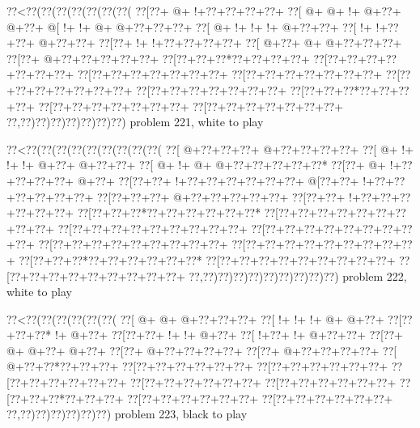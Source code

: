 \vbox{\vbox{\goo
\0??<\0??(\0??(\0??(\0??(\0??(\0??(\0??(
\0??[\0??+\- @+\- !+\0??+\0??+\0??+\0??+
\0??[\- @+\- @+\- !+\- @+\0??+\- @+\0??+
\- @[\- !+\- !+\- @+\- @+\0??+\0??+\0??+
\0??[\- @+\- !+\- !+\- !+\- @+\0??+\0??+
\0??[\- !+\- !+\0??+\0??+\- @+\0??+\0??+
\0??[\0??+\- !+\- !+\0??+\0??+\0??+\0??+
\0??[\- @+\0??+\- @+\- @+\0??+\0??+\0??+
\0??[\0??+\- @+\0??+\0??+\0??+\0??+\0??+
\0??[\0??+\0??+\0??*\0??+\0??+\0??+\0??+
\0??[\0??+\0??+\0??+\0??+\0??+\0??+\0??+
\0??[\0??+\0??+\0??+\0??+\0??+\0??+\0??+
\0??[\0??+\0??+\0??+\0??+\0??+\0??+\0??+
\0??[\0??+\0??+\0??+\0??+\0??+\0??+\0??+
\0??[\0??+\0??+\0??+\0??+\0??+\0??+\0??+
\0??[\0??+\0??+\0??*\0??+\0??+\0??+\0??+
\0??[\0??+\0??+\0??+\0??+\0??+\0??+\0??+
\0??[\0??+\0??+\0??+\0??+\0??+\0??+\0??+
\0??,\0??)\0??)\0??)\0??)\0??)\0??)\0??)
}
\hfil problem 221, white to play\hfil\break
}

\vbox{\vbox{\goo
\0??<\0??(\0??(\0??(\0??(\0??(\0??(\0??(\0??(\0??(
\0??[\- @+\0??+\0??+\0??+\- @+\0??+\0??+\0??+\0??+
\0??[\- @+\- !+\- !+\- !+\- @+\0??+\- @+\0??+\0??+
\0??[\- @+\- !+\- @+\- @+\0??+\0??+\0??+\0??+\0??*
\0??[\0??+\- @+\- !+\0??+\0??+\0??+\0??+\- @+\0??+
\0??[\0??+\0??+\- !+\0??+\0??+\0??+\0??+\0??+\0??+
\- @[\0??+\0??+\- !+\0??+\0??+\0??+\0??+\0??+\0??+
\0??[\0??+\0??+\0??+\- @+\0??+\0??+\0??+\0??+\0??+
\0??[\0??+\0??+\- !+\0??+\0??+\0??+\0??+\0??+\0??+
\0??[\0??+\0??+\0??*\0??+\0??+\0??+\0??+\0??+\0??*
\0??[\0??+\0??+\0??+\0??+\0??+\0??+\0??+\0??+\0??+
\0??[\0??+\0??+\0??+\0??+\0??+\0??+\0??+\0??+\0??+
\0??[\0??+\0??+\0??+\0??+\0??+\0??+\0??+\0??+\0??+
\0??[\0??+\0??+\0??+\0??+\0??+\0??+\0??+\0??+\0??+
\0??[\0??+\0??+\0??+\0??+\0??+\0??+\0??+\0??+\0??+
\0??[\0??+\0??+\0??*\0??+\0??+\0??+\0??+\0??+\0??*
\0??[\0??+\0??+\0??+\0??+\0??+\0??+\0??+\0??+\0??+
\0??[\0??+\0??+\0??+\0??+\0??+\0??+\0??+\0??+\0??+
\0??,\0??)\0??)\0??)\0??)\0??)\0??)\0??)\0??)\0??)
}
\hfil problem 222, white to play\hfil\break
}

\vbox{\vbox{\goo
\0??<\0??(\0??(\0??(\0??(\0??(\0??(
\0??[\- @+\- @+\- @+\0??+\0??+\0??+
\0??[\- !+\- !+\- !+\- @+\- @+\0??+
\0??[\0??+\0??+\0??*\- !+\- @+\0??+
\0??[\0??+\0??+\- !+\- !+\- @+\0??+
\0??[\- !+\0??+\- !+\- @+\0??+\0??+
\0??[\0??+\- @+\- @+\0??+\- @+\0??+
\0??[\0??+\- @+\0??+\0??+\0??+\0??+
\0??[\0??+\- @+\0??+\0??+\0??+\0??+
\0??[\- @+\0??+\0??*\0??+\0??+\0??+
\0??[\0??+\0??+\0??+\0??+\0??+\0??+
\0??[\0??+\0??+\0??+\0??+\0??+\0??+
\0??[\0??+\0??+\0??+\0??+\0??+\0??+
\0??[\0??+\0??+\0??+\0??+\0??+\0??+
\0??[\0??+\0??+\0??+\0??+\0??+\0??+
\0??[\0??+\0??+\0??*\0??+\0??+\0??+
\0??[\0??+\0??+\0??+\0??+\0??+\0??+
\0??[\0??+\0??+\0??+\0??+\0??+\0??+
\0??,\0??)\0??)\0??)\0??)\0??)\0??)
}
\hfil problem 223, black to play\hfil\break
}

